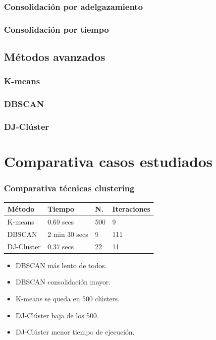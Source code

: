\documentclass[10pt, spanish]{beamer}
\begin{document}
\begin{frame}[fragile]
\frametitle{Consolidaci\'on por adelgazamiento}
\end{frame}

\begin{frame}[fragile]
\frametitle{Consolidaci\'on por tiempo}
\end{frame}

\subsection{M\'etodos avanzados}
\begin{frame}[fragile]
\frametitle{K-means}
\end{frame}

\begin{frame}[fragile]
\frametitle{DBSCAN}
\end{frame}

\begin{frame}[fragile]
\frametitle{DJ-Cl\'uster}
\end{frame}


\section{Comparativa casos estudiados}
\begin{frame}[fragile]
\frametitle{Comparativa t\'ecnicas clustering}
\begin{center}
\begin{tabular}{|l|l|l|l|}
	\hline
	\rowcolor{Gray}
	M\'etodo & Tiempo & N. & Iteraciones\\
	\hline	
	K-means & 0.69 secs & 500 & 9\\
	\hline
	DBSCAN &  2 min 30 secs & 9 & 111 \\
	\hline
	DJ-Cluster &  0.37 secs & 22  & 11\\
	\hline
\end{tabular}
\end{center}

\begin{itemize}
	\item DBSCAN m\'as lento de todos.
	\item DBSCAN consolidaci\'on mayor.
	\item K-means se queda en 500 cl\'usters.
	\item DJ-Cl\'uster baja de los 500.
	\item DJ-Cl\'uster menor tiempo de ejecuci\'on.
\end{itemize}

\end{frame}
\end{document}
